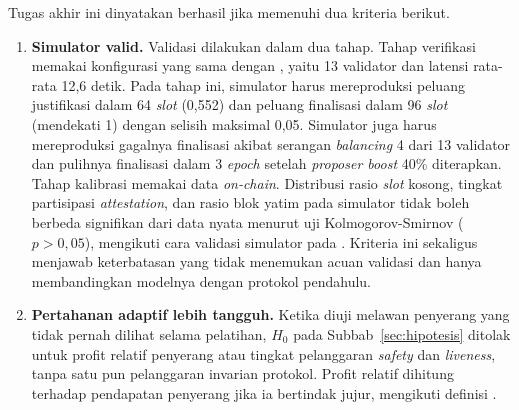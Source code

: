 Tugas akhir ini dinyatakan berhasil jika memenuhi dua kriteria berikut.
\begin{enumerate}
	\item \textbf{Simulator valid.} Validasi dilakukan dalam dua tahap. Tahap verifikasi memakai konfigurasi yang sama dengan \textcite{laneve2025stochastic}, yaitu 13 validator dan latensi rata-rata 12,6 detik. Pada tahap ini, simulator harus mereproduksi peluang justifikasi dalam 64 \textit{slot} (0,552) dan peluang finalisasi dalam 96 \textit{slot} (mendekati 1) dengan selisih maksimal 0,05. Simulator juga harus mereproduksi gagalnya finalisasi akibat serangan \textit{balancing} 4 dari 13 validator dan pulihnya finalisasi dalam 3 \textit{epoch} setelah \textit{proposer boost} 40\% diterapkan. Tahap kalibrasi memakai data \textit{on-chain}. Distribusi rasio \textit{slot} kosong, tingkat partisipasi \textit{attestation}, dan rasio blok yatim pada simulator tidak boleh berbeda signifikan dari data nyata menurut uji Kolmogorov-Smirnov ($p > 0{,}05$), mengikuti cara validasi simulator pada \textcite{skowronski2026adaptive}. Kriteria ini sekaligus menjawab keterbatasan \textcite{laneve2025stochastic} yang tidak menemukan acuan validasi dan hanya membandingkan modelnya dengan protokol pendahulu.
	\item \textbf{Pertahanan adaptif lebih tangguh.} Ketika diuji melawan penyerang yang tidak pernah dilihat selama pelatihan, $H_0$ pada Subbab~\ref{sec:hipotesis} ditolak untuk profit relatif penyerang atau tingkat pelanggaran \textit{safety} dan \textit{liveness}, tanpa satu pun pelanggaran invarian protokol. Profit relatif dihitung terhadap pendapatan penyerang jika ia bertindak jujur, mengikuti definisi \textcite{skowronski2026adaptive}.
\end{enumerate}

